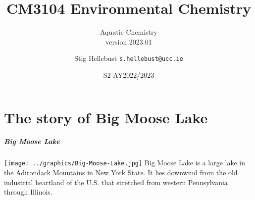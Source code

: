 \documentclass[a4paper,titlepage]{article}
\title[Aquatic chemistry]{CM3104 Environmental Chemistry}
\subtitle{Aquatic Chemistry\\\tiny{version 2023.01}}
\author{Stig Hellebust\inst{1}  \texttt{s.hellebust@ucc.ie}}
\date{S2 AY2022/2023}
\institute
{\inst{1}
  School of Chemistry\\
  University College Cork}
\begin{document}

\begin{frame}
  \titlepage
\end{frame}

\tableofcontents

\part{The story of Big Moose Lake}
\begin{frame}
\frametitle{Big Moose Lake}
\texttt{[image: ../graphics/Big-Moose-Lake.jpg]}
Big Moose Lake is a large lake in the Adirondack Mountains in New York State. It lies downwind from the old industrial heartland of the U.S. that stretched from western Pennsylvania through Illinois.\par\medskip
\end{frame}
\end{document}
